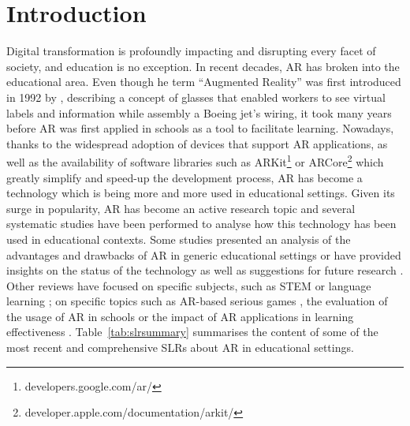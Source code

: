 \section{Introduction} \label{sec:introduction}
Digital transformation is profoundly impacting and disrupting every facet of society, and education is no exception. In recent decades, \gls{AR} has broken into the educational area.
Even though he term ``Augmented Reality'' was first introduced in 1992 by \cite{caudell1992augmented}, describing a concept of glasses that enabled workers to see virtual labels and information while assembly a Boeing jet’s wiring, it took many years before \gls{AR} was first applied in schools as a tool to facilitate learning. Nowadays, thanks to the widespread adoption of devices that support \gls{AR} applications, as well as the availability of software libraries such as ARKit\footnote{developers.google.com/ar/} or ARCore\footnote{developer.apple.com/documentation/arkit/} which greatly simplify and speed-up the development process, \gls{AR} has become a technology which is being more and more used in educational settings. Given its surge in popularity, AR has become an active research topic and several systematic studies have been performed to analyse how this technology has been used in educational contexts. Some studies presented an analysis of the advantages and drawbacks of \gls{AR} in generic educational settings \cite{akccayir2017advantages, radu2014augmented, diegmann2015benefits} or have provided insights on the status of the technology as well as suggestions for future research \cite{cheng2013affordances, arici2019research, bacca2014augmented, pellas2019augmenting}. Other reviews have focused on specific subjects, such as \gls{STEM} \cite{ibanez2018augmented, nielsen2016augmented, ahmad2020augmented} or language learning \cite{majid2021systematic, khoshnevisan2018augmented}; on specific topics such as \gls{AR}-based serious games \cite{li2017augmented, bartolome2011can, laine2018mobile}, the evaluation of the usage of \gls{AR} in schools \cite{da2019perspectives, chen2017review} or the impact of \gls{AR} applications in learning effectiveness \cite{garzon2019systematic}. Table~\ref{tab:slrsummary} summarises the content of some of the most recent and comprehensive \glspl{SLR} about \gls{AR} in educational settings.

